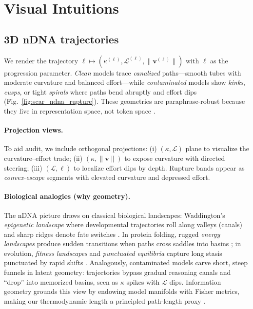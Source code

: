 \documentclass[11pt]{article}
\begin{document}
\vspace{0.75em}
\section{Visual Intuitions}
\label{subsec:visual-intuition}

\subsection{3D nDNA trajectories} 
We render the trajectory $\ell\mapsto (\kappa^{(\ell)},\mathcal{L}^{(\ell)},\|\mathbf{v}^{(\ell)}\|)$ with $\ell$ as the progression parameter. \emph{Clean} models trace \emph{canalized} paths—smooth tubes with moderate curvature and balanced effort—while \emph{contaminated} models show \emph{kinks}, \emph{cusps}, or tight \emph{spirals} where paths bend abruptly and effort dips (Fig.~\ref{fig:scar_ndna_rupture}). These geometries are paraphrase-robust because they live in representation space, not token space \citep{ribeiro2020checklist,iyyer2018scpn}.

\paragraph{Projection views.} To aid audit, we include orthogonal projections:
(i) $(\kappa,\mathcal{L})$ plane to visualize the curvature–effort trade; 
(ii) $(\kappa,\|\mathbf{v}\|)$ to expose curvature with directed steering; 
(iii) $(\mathcal{L},\ell)$ to localize effort dips by depth. Rupture bands appear as \emph{convex-escape} segments with elevated curvature and depressed effort.

\paragraph{Biological analogies (why geometry).}
The nDNA picture draws on classical biological landscapes: Waddington’s \emph{epigenetic landscape} where developmental trajectories roll along valleys (canals) and sharp ridges denote fate switches \citep{waddington1957strategy}. In protein folding, rugged \emph{energy landscapes} produce sudden transitions when paths cross saddles into basins \citep{onuchic1997protein}; in evolution, \emph{fitness landscapes} and \emph{punctuated equilibria} capture long stasis punctuated by rapid shifts \citep{wright1932roles,gould1972punctuated,alon2006systems}. Analogously, contaminated models carve short, steep funnels in latent geometry: trajectories bypass gradual reasoning canals and ``drop'' into memorized basins, seen as $\kappa$ spikes with $\mathcal{L}$ dips. Information geometry grounds this view by endowing model manifolds with Fisher metrics, making our thermodynamic length a principled path-length proxy \citep{amari2016ig,crooks2007measuring,shwartz2017ib}.
\end{document}
